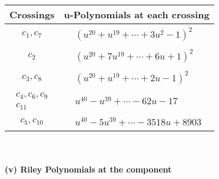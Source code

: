 \documentclass[1p]{elsarticle_modified}
\theoremstyle{definition}
\begin{document}
\begin{tabular}{m{50pt}|m{274pt}}
Crossings & \hspace{64pt}u-Polynomials at each crossing \\
\hline $$\begin{aligned}c_{1},c_{7}\end{aligned}$$&$\begin{aligned}
&(u^{20}+u^{19}+\cdots+3 u^2-1)^{2}
\end{aligned}$\\
\hline $$\begin{aligned}c_{2}\end{aligned}$$&$\begin{aligned}
&(u^{20}+7 u^{19}+\cdots+6 u+1)^{2}
\end{aligned}$\\
\hline $$\begin{aligned}c_{3},c_{8}\end{aligned}$$&$\begin{aligned}
&(u^{20}+u^{19}+\cdots+2 u-1)^{2}
\end{aligned}$\\
\hline $$\begin{aligned}c_{4},c_{6},c_{9}\\c_{11}\end{aligned}$$&$\begin{aligned}
&u^{40}- u^{39}+\cdots-62 u-17
\end{aligned}$\\
\hline $$\begin{aligned}c_{5},c_{10}\end{aligned}$$&$\begin{aligned}
&u^{40}-5 u^{39}+\cdots-3518 u+8903
\end{aligned}$\\
\hline
\end{tabular}\\~\\
\newpage\renewcommand{\arraystretch}{1}
\flushleft \textbf{(v) Riley Polynomials at the component}\newline \\
\end{document}
